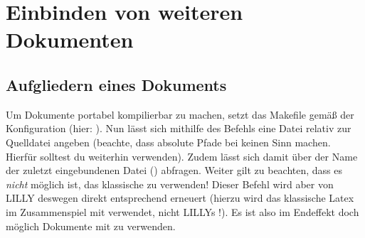 \section{Einbinden von weiteren Dokumenten}
\subsection{Aufgliedern eines Dokuments}
Um Dokumente portabel kompilierbar zu machen, setzt das Makefile gemäß der Konfiguration  (hier: \say{\T{\LILLYxPATH}}). Nun lässt sich mithilfe des Befehls  eine Datei relativ zur Quelldatei angeben (beachte, dass absolute Pfade bei  keinen Sinn machen. Hierfür solltest du weiterhin  verwenden).\newline
Zudem lässt sich damit über  der Name der zuletzt eingebundenen Datei (\T{\LILLYxDOCUMENTxSUBNAME}) abfragen.\newline
{}Weiter gilt zu beachten, dass es \emph{nicht} möglich ist, das klassische  zu verwenden! Dieser Befehl wird aber von LILLY deswegen direkt entsprechend erneuert (hierzu wird das klassische Latex  im Zusammenspiel mit  verwendet, nicht LILLYs !). Es ist also im Endeffekt doch möglich Dokumente mit   zu verwenden.




